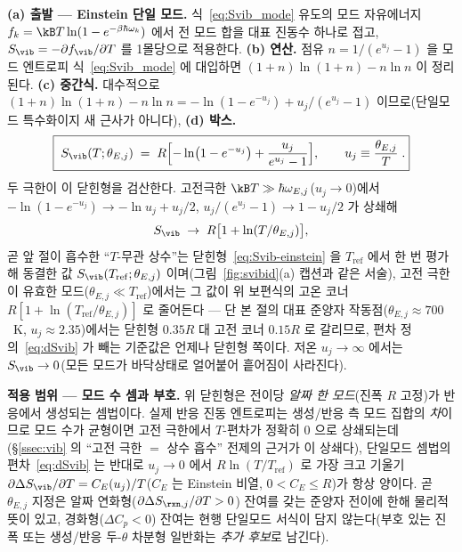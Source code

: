 \textbf{(a) 출발 --- Einstein 단일 모드.} 식~\eqref{eq:Svib_mode} 유도의 모드 자유에너지
$f_k=\kB T\ln(1-e^{-\beta\hbar\omega_k})$ 에서 전 모드 합을 대표 진동수 하나로 접고, $S_\vib=-\partial
f_\vib/\partial T$ 를 1몰당으로 적용한다. \textbf{(b) 연산.} 점유 $n=1/(e^{u_j}-1)$ 을 모드 엔트로피
식~\eqref{eq:Svib_mode} 에 대입하면 $(1+n)\ln(1+n)-n\ln n$ 이 정리된다. \textbf{(c) 중간식.} 대수적으로
$(1+n)\ln(1+n)-n\ln n=-\ln(1-e^{-u_j})+u_j/(e^{u_j}-1)$ 이므로(단일모드 특수화이지 새 근사가 아니다),
\textbf{(d) 박스.}
\begin{equation}
\boxed{\;S_\vib(T;\theta_{E,j}) \;=\; R\Bigl[-\ln\bigl(1-e^{-u_j}\bigr)+\frac{u_j}{e^{u_j}-1}\Bigr],
\qquad u_j\equiv\frac{\theta_{E,j}}{T}\;.}
\label{eq:Svib-einstein}
\end{equation}
두 극한이 이 닫힌형을 검산한다. 고전극한 $\kB T\gg\hbar\omega_{E,j}$($u_j\to0$)에서
$-\ln(1-e^{-u_j})\to-\ln u_j+u_j/2$, $u_j/(e^{u_j}-1)\to1-u_j/2$ 가 상쇄해
\[
S_\vib\;\to\;R\bigl[1+\ln(T/\theta_{E,j})\bigr],
\]
곧 앞 절이 흡수한 ``$T$-무관 상수''는 닫힌형~\eqref{eq:Svib-einstein} 을 $T_\mathrm{ref}$ 에서 한 번 평가해
동결한 값 $S_\vib(T_\mathrm{ref};\theta_{E,j})$ 이며(그림~\ref{fig:svibid}(a) 캡션과 같은 서술), 고전 극한이
유효한 모드($\theta_{E,j}\ll T_\mathrm{ref}$)에서는 그 값이 위 보편식의 고온 코너
$R[1+\ln(T_\mathrm{ref}/\theta_{E,j})]$ 로 줄어든다 --- 단 본 절의 대표 준양자 작동점($\theta_{E,j}{\approx}700$~K,
$u_j{\approx}2.35$)에서는 닫힌형 $0.35R$ 대 고전 코너 $0.15R$ 로 갈리므로, 편차 정의~\eqref{eq:dSvib} 가 빼는
기준값은 언제나 닫힌형 쪽이다. 저온 $u_j\to\infty$ 에서는 $S_\vib\to0$(모든 모드가 바닥상태로 얼어붙어
흩어짐이 사라진다).

\textbf{적용 범위 --- 모드 수 셈과 부호.} 위 닫힌형은 전이당 \emph{알짜 한 모드}(진폭 $R$ 고정)가 반응에서
생성되는 셈법이다. 실제 반응 진동 엔트로피는 생성/반응 측 모드 집합의 \emph{차}이므로 모드 수가 균형이면
고전 극한에서 $T$-편차가 정확히 $0$ 으로 상쇄되는데(\S\ref{ssec:vib} 의 ``고전 극한 $=$ 상수 흡수'' 전제의
근거가 이 상쇄다), 단일모드 셈법의 편차~\eqref{eq:dSvib} 는 반대로 $u_j\to0$ 에서 $R\ln(T/T_\mathrm{ref})$ 로
가장 크고 기울기 $\partial\Delta S_\vib/\partial T=C_E(u_j)/T$($C_E$ 는 Einstein 비열, $0<C_E\le R$)가 항상
양이다. 곧 $\theta_{E,j}$ 지정은 알짜 연화형($\partial\Delta S_{\rxn,j}/\partial T>0$) 잔여를 갖는 준양자
전이에 한해 물리적 뜻이 있고, 경화형($\Delta C_p<0$) 잔여는 현행 단일모드 서식이 담지 않는다(부호 있는
진폭 또는 생성/반응 두-$\theta$ 차분형 일반화는 \emph{추가 후보}로 남긴다).

